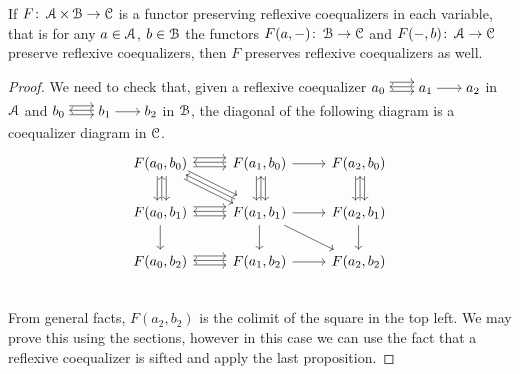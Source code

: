 \documentclass[a4paper,11pt,oneside,openany]{scrbook}
\begin{document}
\begin{prop}
	If $F\colon\operatorname{\mathcal{A}}\times\operatorname{\mathcal{B}}\rightarrow\operatorname{\mathcal{C}}$ is a functor preserving reflexive coequalizers in each variable, that is for any $a\in\operatorname{\mathcal{A}}$, $b\in\operatorname{\mathcal{B}}$ the functors $F(a,-)\colon\operatorname{\mathcal{B}}\rightarrow\operatorname{\mathcal{C}}$ and $F(-,b)\colon\operatorname{\mathcal{A}}\rightarrow\operatorname{\mathcal{C}}$ preserve reflexive coequalizers, then $F$ preserves reflexive coequalizers as well.
\end{prop}

\begin{proof}
	We need to check that, given a reflexive coequalizer $\hspace{-1.5mm}\begin{tikzcd}
			a_0\hspace{-1.5mm}\arrow[r, shift right=.5ex, shorten <= .3em, shorten >= .3em]  \arrow[r, shift left=1ex, shorten <= .3em, shorten >= .3em] & \hspace{-1.5mm}a_1\hspace{-1.5mm}\arrow[l, shift right=.25ex, shorten <=.3em, shorten >=.3em]\arrow[r, shorten <= .3em, shorten >= .3em] & \hspace{-1.5mm}a_2
		\end{tikzcd}\hspace{-1.5mm}$ in $\operatorname{\mathcal{A}}$ and $\hspace{-1.5mm}\begin{tikzcd}
			b_0\hspace{-1.5mm}\arrow[r, shift right=.5ex, shorten <= .3em, shorten >= .3em]  \arrow[r, shift left=1ex, shorten <= .3em, shorten >= .3em] & \hspace{-1.5mm}b_1\hspace{-1.5mm}\arrow[l, shift right=.25ex, shorten <=.3em, shorten >=.3em]\arrow[r, shorten <= .3em, shorten >= .3em] & \hspace{-1.5mm}b_2
		\end{tikzcd}\hspace{-1.5mm}$ in $\operatorname{\mathcal{B}}$, the diagonal of the following diagram is a coequalizer diagram in $\operatorname{\mathcal{C}}$.
	\[
		\begin{tikzcd}
			F(a_0,b_0)\ar[r, shift right=.5ex]\ar[r, shift left=1ex]\ar[d, shift right=.5ex]\ar[d, shift left=1ex]\ar[dr, shift right=.5ex]\ar[dr, shift left=1ex]
			& F(a_1,b_0)\ar[d, shift right=.5ex]\ar[d, shift left=1ex]\ar[l, shift right=.25ex]\ar[r]
			& F(a_2,b_0)\ar[d, shift right=.5ex]\ar[d, shift left=1ex] \\
			F(a_0,b_1)\ar[r, shift right=.5ex]\ar[r, shift left=1ex]\ar[u, shift right=.25ex]\ar[d]
			& F(a_1,b_1)\ar[u, shift right=.25ex]\ar[l, shift right=.25ex]\ar[ul, shift right=.25ex]\ar[r]\ar[d]\ar[dr]
			& F(a_2,b_1)\ar[u, shift right=.25ex]\ar[d] \\
			F(a_0,b_2)\ar[r, shift right=.5ex]\ar[r, shift left=1ex]
			& F(a_1,b_2)\ar[l, shift right=.25ex]\ar[r]
			& F(a_2,b_2) \\
		\end{tikzcd}
	\]
	From general facts, $F(a_2,b_2)$ is the colimit of the square in the top
	left. We may prove this using the sections, however in this case we can use
	the fact that a reflexive coequalizer is sifted and apply the last
	proposition.
\end{proof}
\end{document}
